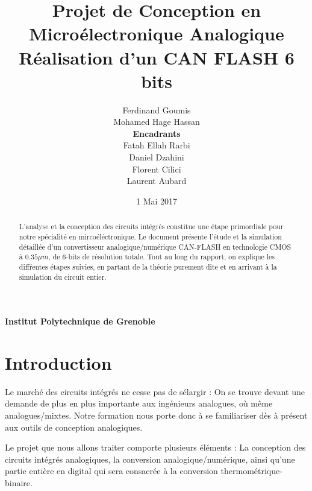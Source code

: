 \documentclass[11pt]{article}
\begin{document}
\title{\textbf{Projet de Conception en Micro\'electronique Analogique} \\ R\'ealisation d'un CAN FLASH 6 bits}
\author{Ferdinand Goumis \\ Mohamed Hage Hassan \medskip\\\medskip \textbf{Encadrants} \medskip \\ Fatah Ellah Rarbi \\ Daniel Dzahini \\ Florent Cilici \\ Laurent Aubard}
\date{1 Mai 2017}
\maketitle
\thispagestyle{empty}

\renewcommand{\abstractname}{Pr\'emabule}

\begin{abstract}
L'analyse et la conception des circuits int\'egr\'es constitue une \'etape primordiale pour notre sp\'ecialit\'e en mirco\'el\'ectronique. Le document pr\'esente l'\'etude et la simulation d\'etaill\'ee d'un convertisseur analogique/num\'erique CAN-FLASH en technologie CMOS \`a $0.35 \mu m$, de 6-bits de r\'esolution totale. Tout au long du rapport, on explique les diff\'rentes \'etapes suivies, en partant de la th\'eorie purement dite et en arrivant \`a la simulation du circuit entier.
  
\end{abstract}

\vskip 9.5cm
\begin{center} \textbf{Institut Polytechnique de Grenoble} \end{center}

\clearpage

\tableofcontents
\clearpage

\section{Introduction}

Le march\'e des circuits int\'egr\'es ne cesse pas de s\'elargir : On se trouve devant une demande de plus en plus importante aux ing\'enieurs analogues, o\`u m\^eme analogues/mixtes. Notre formation nous porte donc \`a se familiariser d\`es \`a pr\'esent aux outils de conception analogiques. 

Le projet que nous allons traiter comporte plusieurs \'el\'ements : La conception des circuits int\'egr\'es analogiques, la conversion analogique/num\'erique, ainsi qu'une partie enti\`ere en digital qui sera consacr\'ee \`a la conversion thermom\'etrique-binaire.
\end{document}
